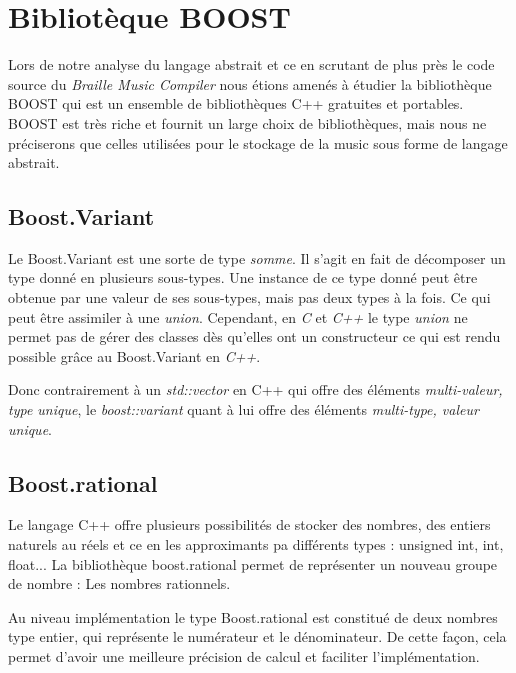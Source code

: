 \section{Bibliotèque BOOST}

Lors de notre analyse du langage abstrait et ce en scrutant de plus près le code source du \textit{Braille Music Compiler} nous étions amenés à étudier la bibliothèque BOOST  qui est un ensemble de bibliothèques C++ gratuites et portables. BOOST est très riche et fournit un large choix de bibliothèques, mais nous ne préciserons que celles utilisées pour le stockage de la music sous forme de langage abstrait.


\subsection*{Boost.Variant}

Le Boost.Variant est une sorte de type \textit{somme}. Il s'agit en fait de décomposer un type donné en plusieurs sous-types. Une instance de ce type donné peut être obtenue par une valeur de ses sous-types, mais pas deux types à la fois. Ce qui peut être assimiler à une \textit{union}. Cependant, en \textit{C} et \textit{C++} le type \textit{union} ne permet pas de gérer des classes dès qu'elles ont un constructeur ce qui est rendu possible grâce au Boost.Variant en \textit{C++}.

Donc contrairement à un \textit{std::vector} en C++ qui offre des éléments \textit{multi-valeur, type unique}, le \textit{boost::variant} quant à lui offre des éléments \textit{multi-type, valeur unique}.


\subsection*{Boost.rational}

Le langage C++ offre plusieurs possibilités de stocker des nombres, des entiers naturels au réels et ce en les approximants pa différents types : unsigned int, int, float... La bibliothèque boost.rational permet de représenter un nouveau groupe de nombre : Les nombres rationnels.

Au niveau implémentation le type Boost.rational est constitué de deux nombres type entier, qui représente le numérateur et le dénominateur. De cette façon, cela permet d'avoir une meilleure précision de calcul et faciliter l'implémentation.


